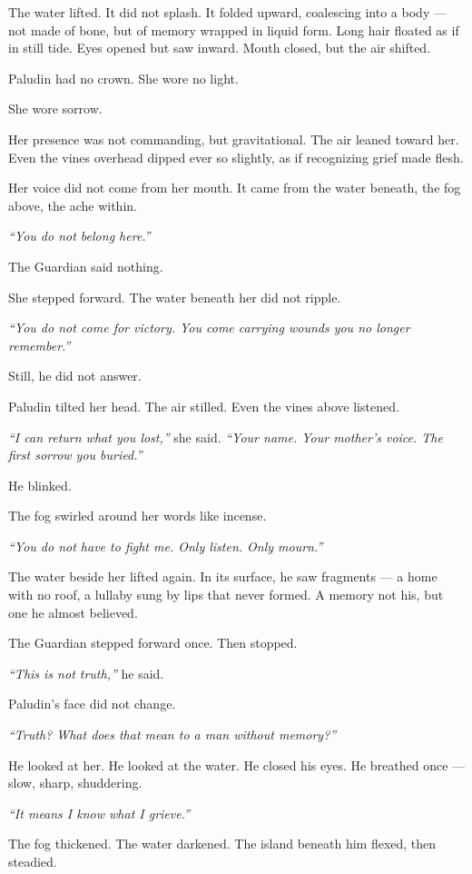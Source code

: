 \documentclass[12pt]{article}
\begin{document}
The water lifted. It did not splash. It folded upward, coalescing into a body — not made of bone, but of memory wrapped in liquid form. Long hair floated as if in still tide. Eyes opened but saw inward. Mouth closed, but the air shifted.

Paludin had no crown. She wore no light.

She wore sorrow.

Her presence was not commanding, but gravitational. The air leaned toward her. Even the vines overhead dipped ever so slightly, as if recognizing grief made flesh.

Her voice did not come from her mouth. It came from the water beneath, the fog above, the ache within.

\textit{``You do not belong here.''}

The Guardian said nothing.

She stepped forward. The water beneath her did not ripple.

\textit{``You do not come for victory. You come carrying wounds you no longer remember.''}

Still, he did not answer.

Paludin tilted her head. The air stilled. Even the vines above listened.

\textit{``I can return what you lost,''} she said. \textit{``Your name. Your mother’s voice. The first sorrow you buried.''}

He blinked.

The fog swirled around her words like incense.

\textit{``You do not have to fight me. Only listen. Only mourn.''}

The water beside her lifted again. In its surface, he saw fragments — a home with no roof, a lullaby sung by lips that never formed. A memory not his, but one he almost believed.

The Guardian stepped forward once. Then stopped.

\textit{``This is not truth,''} he said.

Paludin’s face did not change.

\textit{``Truth? What does that mean to a man without memory?''}

He looked at her. He looked at the water. He closed his eyes. He breathed once — slow, sharp, shuddering.

\textit{``It means I know what I grieve.''}

The fog thickened. The water darkened. The island beneath him flexed, then steadied.
\end{document}
